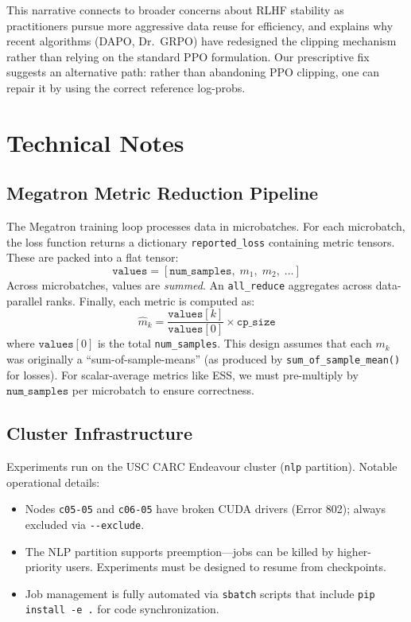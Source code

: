 \documentclass[11pt,a4paper]{article}
\begin{document}
This narrative connects to broader concerns about RLHF stability as
practitioners pursue more aggressive data reuse for efficiency, and explains
why recent algorithms (DAPO, Dr.~GRPO) have redesigned the clipping mechanism
rather than relying on the standard PPO formulation. Our prescriptive fix
suggests an alternative path: rather than abandoning PPO clipping, one can
repair it by using the correct reference log-probs.


\appendix
\section{Technical Notes}
\label{app:technical}

\subsection{Megatron Metric Reduction Pipeline}

The Megatron training loop processes data in microbatches. For each microbatch,
the loss function returns a dictionary \texttt{reported\_loss} containing metric
tensors. These are packed into a flat tensor:
\[
  \texttt{values} = [\texttt{num\_samples},\; m_1,\; m_2,\; \ldots]
\]
Across microbatches, values are \emph{summed}. An \texttt{all\_reduce} aggregates
across data-parallel ranks. Finally, each metric is computed as:
\[
  \hat{m}_k = \frac{\texttt{values}[k]}{\texttt{values}[0]} \times \texttt{cp\_size}
\]
where $\texttt{values}[0]$ is the total \texttt{num\_samples}. This design
assumes that each $m_k$ was originally a ``sum-of-sample-means'' (as produced by
\texttt{sum\_of\_sample\_mean()} for losses). For scalar-average metrics like
ESS, we must pre-multiply by $\texttt{num\_samples}$ per microbatch to ensure
correctness.

\subsection{Cluster Infrastructure}

Experiments run on the USC CARC Endeavour cluster (\texttt{nlp} partition).
Notable operational details:

\begin{itemize}[leftmargin=*]
  \item Nodes \texttt{c05-05} and \texttt{c06-05} have broken CUDA drivers
    (Error 802); always excluded via \texttt{-{}-exclude}.
  \item The NLP partition supports preemption---jobs can be killed by
    higher-priority users. Experiments must be designed to resume from
    checkpoints.
  \item Job management is fully automated via \texttt{sbatch} scripts that
    include \texttt{pip install -e .} for code synchronization.
\end{itemize}
\end{document}
